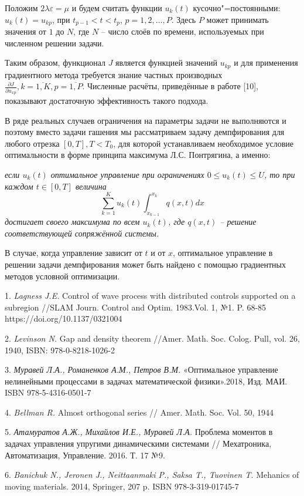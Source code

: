 Положим $2\lambda\varepsilon=\mu$ и будем считать функции $u_k(t)$ кусочно"=постоянными: $u_k(t)=u_{kp}$, при $t_{p-1}<t<t_p$, $p=1,2,\dots,P$. Здесь $P$ может принимать значения от $1$ до $N$, где $N$ -- число слоёв по времени, используемых при численном решении задачи.

Таким образом, функционал $J$ является функцией значений $u_{kp}$ и для применения градиентного метода требуется знание частных производных $\frac{\partial J}{\partial u_{xp}}, k=\overline{1,K}, p=\overline{1,P}.$ Численные расчёты, приведённые в работе [10], показывают достаточную эффективность такого подхода.

В ряде реальных случаев ограничения на параметры задачи не выполняются и поэтому вместо задачи гашения мы рассматриваем задачу демпфирования для любого отрезка $[0,T], T<T_0$, для которой устанавливаем необходимое условие оптимальности в форме принципа максимума Л.С. Понтрягина, а именно:

 {\it если $u_k(t)$ оптимальное управление при ограничениях
	$0\leq u_k(t)\leq U$, то при каждом $t\in[0,T]$ величина
	$$\sum_{k=1}^{K}u_k(t)\int_{x_{k-1}}^{x_k}q\left(x,t\right)dx$$
	достигает своего максимума по всем $u_k(t)$, где $q(x,t)$ -- решение соответствующей сопряжённой системы.
}

В случае, когда управление зависит от $t$ и от $x$, оптимальное управление в решении задачи демпфирования может быть найдено с помощью градиентных методов условной оптимизации.

\litlist

1. {\it Lagness J.E.} Control of wave process with distributed controls supported on a subregion //SLAM Journ. Control and Optim. 1983.Vol. 1, №1. P. 68-85 https://doi.org/10.1137/0321004

2. {\it Levinson N.} Gap and density theorem //Amer. Math. Soc. Colog. Pull, vol. 26, 1940, ISBN: 978-0-8218-1026-2

3. {\it Муравей Л.А., Романенков А.М., Петров В.М.} «Оптимальное управление нелинейными процессами в задачах математической физики».2018, Изд. МАИ. ISBN 978-5-4316-0501-7

4. {\it Bellman R.} Almost orthogonal series // Amer. Math. Soc. Vol. 50, 1944

5.  {\it Атамуратов А.Ж., Михайлов И.Е., Муравей Л.А.} Проблема моментов в задачах управления упругими динамическими системами // Мехатроника, Автоматизация, Управление. 2016. Т. 17 №9.

6. {\it Banichuk N., Jeronen J., Neittaanmaki P., Saksa T., Tuovinen T.} Mehanics of moving materials. 2014, Springer, 207 p. ISBN 978-3-319-01745-7

